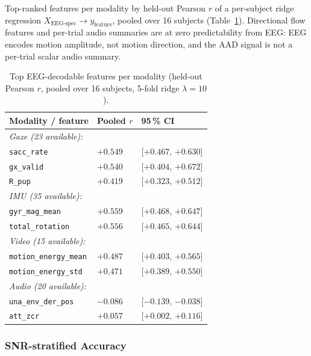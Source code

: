 \documentclass{article}
\begin{document}
Top-ranked features per modality by held-out Pearson $r$ of a per-subject
ridge regression $X_\text{EEG-spec} \to y_\text{feature}$, pooled over 16
subjects (Table~\ref{tab:xmodal}). Directional flow features and per-trial
audio summaries are at zero predictability from EEG: EEG encodes motion
amplitude, not motion direction, and the AAD signal is not a per-trial scalar
audio summary.

\begin{table}[ht]
\centering
\small
\caption{Top EEG-decodable features per modality (held-out Pearson $r$,
pooled over 16 subjects, 5-fold ridge $\lambda=10$).}
\label{tab:xmodal}
\begin{tabular}{lll}
\toprule
Modality / feature & Pooled $r$ & 95\,\% CI \\
\midrule
\multicolumn{3}{l}{\emph{Gaze (23 available):}} \\
\texttt{sacc\_rate}           & $+0.549$ & [$+0.467$, $+0.630$] \\
\texttt{gx\_valid}            & $+0.540$ & [$+0.404$, $+0.672$] \\
\texttt{R\_pup}               & $+0.419$ & [$+0.323$, $+0.512$] \\
\multicolumn{3}{l}{\emph{IMU (35 available):}} \\
\texttt{gyr\_mag\_mean}       & $+0.559$ & [$+0.468$, $+0.647$] \\
\texttt{total\_rotation}      & $+0.556$ & [$+0.465$, $+0.644$] \\
\multicolumn{3}{l}{\emph{Video (15 available):}} \\
\texttt{motion\_energy\_mean} & $+0.487$ & [$+0.403$, $+0.565$] \\
\texttt{motion\_energy\_std}  & $+0.471$ & [$+0.389$, $+0.550$] \\
\multicolumn{3}{l}{\emph{Audio (20 available):}} \\
\texttt{una\_env\_der\_pos}   & $-0.086$ & [$-0.139$, $-0.038$] \\
\texttt{att\_zcr}             & $+0.057$ & [$+0.002$, $+0.116$] \\
\bottomrule
\end{tabular}
\end{table}

\subsubsection{SNR-stratified Accuracy}
\label{app:snr}
\end{document}
